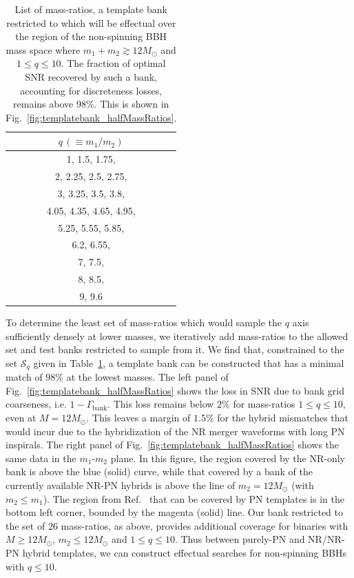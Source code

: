 \documentclass[aps,
prd,
twocolumn,
superscriptaddress,
lengthcheck,showpacs,letterpaper,nofootinbib,
floatfix]{revtex4-1}
\begin{document}
\begin{table}
\begin{tabular}{| c |}
\hline
$q\,(\equiv m_1/m_2)$ \\ \hline
1, 1.5, 1.75, \\
2, 2.25, 2.5, 2.75, \\
3, 3.25, 3.5, 3.8, \\
4.05, 4.35, 4.65, 4.95, \\
5.25, 5.55, 5.85, \\
6.2, 6.55, \\
7, 7.5, \\
8, 8.5, \\
9, 9.6 \\
\hline
\end{tabular}
\caption{List of mass-ratios, a template bank restricted to which will be effectual
over the region of the non-spinning BBH mass space where $m_1+m_2\gtrsim 12M_\odot$
and $1\leq q\leq 10$. The fraction of optimal SNR recovered by such a bank,
accounting for discreteness losses, remains above $98\%$. This is shown in
Fig.~\ref{fig:templatebank_halfMassRatios}.}
\label{table:fullqlist}
\end{table}
To determine the least set of mass-ratios which would sample the $q$ axis 
sufficiently densely at lower masses, we iteratively add mass-ratios to the 
allowed set and test banks restricted to sample from it. We find that, 
constrained to the set $\mathcal{S}_q$ given in Table~\ref{table:fullqlist},
a template bank can be constructed that has a minimal match of $98\%$
at the lowest masses. The left panel of Fig.~\ref{fig:templatebank_halfMassRatios}
shows the loss in SNR due to bank grid coarseness, i.e. $1-\Gamma_\mathrm{bank}$. 
This loss remains below $2\%$ for mass-ratios $1\leq q\leq 10$, even at 
$M=12M_\odot$. This 
leaves a margin of $1.5\%$ for the hybrid mismatches that would incur due to 
the hybridization of the NR merger waveforms with long PN inspirals. The right 
panel of Fig.~\ref{fig:templatebank_halfMassRatios} shows the same data in the 
$m_1$-$m_2$ plane. In this figure, 
the region covered by the NR-only bank is above the blue (solid) curve, while 
that covered by a bank of the currently available NR-PN hybrids is above the
line of $m_2 = 12M_\odot$ (with $m_2\leq m_1$). The region from 
Ref.~\cite{Brown:2012nn,CompTemplates2009} that can be covered by PN templates 
is in the bottom
left corner, bounded by the magenta (solid) line. Our bank restricted to the
set of $26$ mass-ratios, as above, provides additional coverage for binaries
with $M\geq 12M_\odot$, $m_2\leq 12M_\odot$ and $1\leq q\leq 10$.
Thus between purely-PN and NR/NR-PN hybrid templates, we can construct 
effectual searches for non-spinning BBHs with $q\leq 10$.
\end{document}
